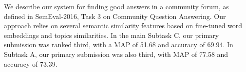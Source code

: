 We describe our system for finding good answers in a community forum, as defined in SemEval-2016, Task 3 on Community Question Answering. Our approach relies on several semantic similarity features based on fine-tuned word embeddings and topics similarities. In the main Subtask C, our primary submission was ranked third, with a MAP of 51.68 and accuracy of 69.94. In Subtask A, our primary submission was also third, with MAP of 77.58 and accuracy of 73.39.

